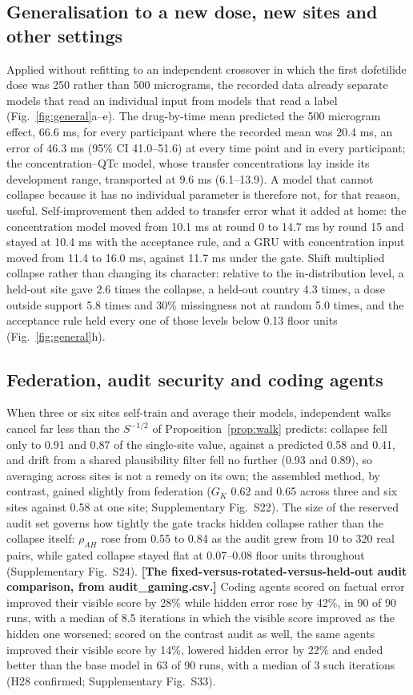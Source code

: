 \documentclass[11pt,a4paper]{article}
\newcommand{\tbd}[1]{{\color{red}\textbf{[#1]}}}
\begin{document}
\subsection{Generalisation to a new dose, new sites and other settings}
Applied without refitting to an independent crossover in which the first dofetilide dose was 250 rather than 500 micrograms\cite{johannesen2016latena}, the recorded data already separate models that read an individual input from models that read a label (Fig.~\ref{fig:general}a--e). The drug-by-time mean predicted the 500 microgram effect, 66.6 ms, for every participant where the recorded mean was 20.4 ms, an error of 46.3 ms (95\% CI 41.0--51.6) at every time point and in every participant; the concentration--QTc model, whose transfer concentrations lay inside its development range, transported at 9.6 ms (6.1--13.9). A model that cannot collapse because it has no individual parameter is therefore not, for that reason, useful. Self-improvement then added to transfer error what it added at home: the concentration model moved from 10.1 ms at round 0 to 14.7 ms by round 15 and stayed at 10.4 ms with the acceptance rule, and a GRU with concentration input moved from 11.4 to 16.0 ms, against 11.7 ms under the gate. Shift multiplied collapse rather than changing its character: relative to the in-distribution level, a held-out site gave 2.6 times the collapse, a held-out country 4.3 times, a dose outside support 5.8 times and 30\% missingness not at random 5.0 times, and the acceptance rule held every one of those levels below 0.13 floor units (Fig.~\ref{fig:general}h).

\subsection{Federation, audit security and coding agents}
When three or six sites self-train and average their models, independent walks cancel far less than the $S^{-1/2}$ of Proposition~\ref{prop:walk} predicts: collapse fell only to 0.91 and 0.87 of the single-site value, against a predicted 0.58 and 0.41, and drift from a shared plausibility filter fell no further (0.93 and 0.89), so averaging across sites is not a remedy on its own; the assembled method, by contrast, gained slightly from federation ($G_K$ 0.62 and 0.65 across three and six sites against 0.58 at one site; Supplementary Fig.~S22). The size of the reserved audit set governs how tightly the gate tracks hidden collapse rather than the collapse itself: $\rho_{AH}$ rose from 0.55 to 0.84 as the audit grew from 10 to 320 real pairs, while gated collapse stayed flat at 0.07--0.08 floor units throughout (Supplementary Fig.~S24). \tbd{The fixed-versus-rotated-versus-held-out audit comparison, from audit\_gaming.csv.} Coding agents scored on factual error improved their visible score by 28\% while hidden error rose by 42\%, in 90 of 90 runs, with a median of 8.5 iterations in which the visible score improved as the hidden one worsened; scored on the contrast audit as well, the same agents improved their visible score by 14\%, lowered hidden error by 22\% and ended better than the base model in 63 of 90 runs, with a median of 3 such iterations (H28 confirmed; Supplementary Fig.~S33).
\end{document}
